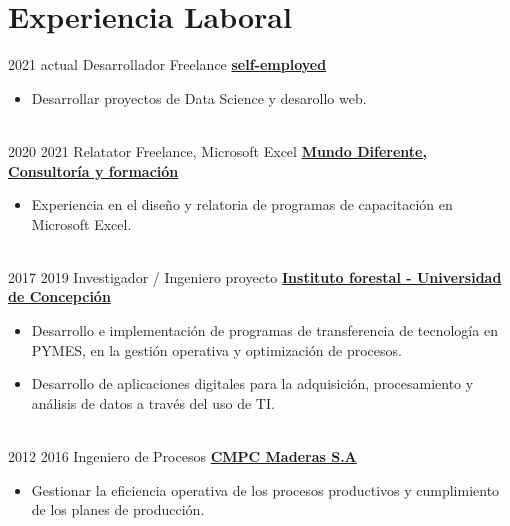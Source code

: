\documentclass[letterpaper]{DS_class_file} %
\begin{document}
\newpage

\makeseconda %

\section{Experiencia Laboral}
\begin{twenty}
		\twentyitem
	{2021}
	{actual}
	{\hspace{0.2cm}Desarrollador Freelance}
	{\href{https://portfolio-mparraf.herokuapp.com/}{\hspace{0.05cm} \textbf{self-employed} }}
	{}
	{\begin{itemize}
			\item Desarrollar proyectos de Data Science y desarollo web.
	\end{itemize}}
	\\
	\twentyitem
	{2020}
	{2021}
	{\hspace{0.2cm}Relatator Freelance, Microsoft Excel}
	{\href{https://www.mundodiferente.cl/}{\hspace{0.05cm} \textbf{Mundo Diferente, Consultoría y formación} }}
	{}
	{\begin{itemize}
			\item Experiencia en el diseño y relatoria de programas de capacitación en Microsoft Excel.
	\end{itemize}}
	\\
	\twentyitem
	{2017}
	{2019}
	{\hspace{0.3cm}Investigador / Ingeniero proyecto}
	{\href{https://www.infor.cl/}{\hspace{0.05cm} \textbf{Instituto forestal -  Universidad de Concepción} }}
	{}
	{\begin{itemize}
			\item Desarrollo e implementación de programas de transferencia de tecnología en PYMES, en la gestión operativa y optimización de procesos.
			\item Desarrollo de aplicaciones digitales para la adquisición, procesamiento y análisis de datos a través del uso de TI.
	\end{itemize}}
	\\
	\twentyitem
	{2012}
	{2016}
	{\hspace{0.3cm}Ingeniero de Procesos}
	{\href{https://www.cmpcmaderas.com/}{\textbf{CMPC Maderas S.A}}}
	{}
	{\begin{itemize}
			\item Gestionar la eficiencia operativa de los procesos productivos y cumplimiento de los planes de producción.

\end{itemize}}
\end{twenty}
\end{document}
